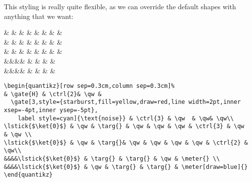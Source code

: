 \documentclass[aps,pra,10pt,nofootinbib]{revtex4}
\begin{document}
This styling is really quite flexible, as we can override the default shapes with anything that we want:
\begin{Code}
\begin{center}
\begin{quantikz}[row sep=0.3cm,column sep=0.3cm]%
&  & & \qw &  &  & \qw  & \qw & \qw\\
 & \qw & \targ{} & \qw & \qw & \qw &  & \qw & \qw \\
 & \qw & \targ{}& \qw & \qw & \qw & \qw &  & \qw\\
&&&& & \targ{} & \targ{} & \qw & \meter{} \\
&&&& & \qw & \targ{} & \targ{} & \meter[draw=blue]{} 
\end{quantikz}
\end{center}
\tcblower
\begin{lstlisting}
\begin{quantikz}[row sep=0.3cm,column sep=0.3cm]%
& \gate{H} & \ctrl{2}& \qw & 
  \gate[3,style={starburst,fill=yellow,draw=red,line width=2pt,inner xsep=-4pt,inner ysep=-5pt},
    label style=cyan]{\text{noise}} & \ctrl{3} & \qw  & \qw& \qw\\
\lstick{$\ket{0}$} & \qw & \targ{} & \qw & \qw & \qw & \ctrl{3} & \qw & \qw \\
\lstick{$\ket{0}$} & \qw & \targ{}& \qw & \qw & \qw & \qw & \ctrl{2} & \qw\\
&&&&\lstick{$\ket{0}$} & \targ{} & \targ{} & \qw & \meter{} \\
&&&&\lstick{$\ket{0}$} & \qw & \targ{} & \targ{} & \meter[draw=blue]{} 
\end{quantikz}
\end{lstlisting}
\end{Code}
\end{document}
